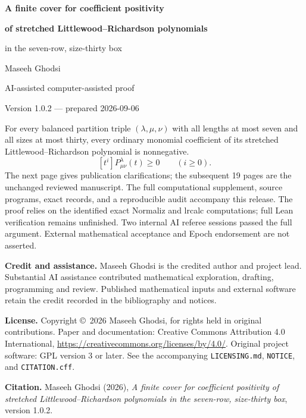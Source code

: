 \documentclass[11pt]{article}
\begin{document}
\thispagestyle{empty}
\begin{center}
{\LARGE\bfseries A finite cover for coefficient positivity\par}
\vspace{0.25cm}
{\Large\bfseries of stretched Littlewood--Richardson polynomials\par}
\vspace{0.25cm}
{\large in the seven-row, size-thirty box\par}
\vspace{0.85cm}
{\Large Maseeh Ghodsi\par}
\vspace{0.3cm}
AI-assisted computer-assisted proof\par
Version 1.0.2 --- prepared 2026-09-06\par
\end{center}
\vspace{0.55cm}
For every balanced partition triple $(\lambda,\mu,\nu)$ with all lengths at
most seven and all sizes at most thirty, every ordinary monomial coefficient
of its stretched Littlewood--Richardson polynomial is nonnegative.
\[
 [t^i]P^{\lambda}_{\mu\nu}(t)\ge0\qquad(i\ge0).
\]
The next page gives publication clarifications; the subsequent 19 pages
are the unchanged reviewed manuscript. The full
computational supplement, source programs, exact records, and a reproducible
audit accompany this release. The proof relies on the identified exact
Normaliz and lrcalc computations; full Lean verification remains unfinished.
Two internal AI referee sessions passed the full argument. External
mathematical acceptance and Epoch endorsement are not asserted.
\par\medskip
\textbf{Credit and assistance.} Maseeh Ghodsi is the credited author and project
lead. Substantial AI assistance contributed mathematical exploration,
drafting, programming and review. Published mathematical inputs and external
software retain the credit recorded in the bibliography and notices.
\par\medskip
\textbf{License.} Copyright \copyright\ 2026 Maseeh Ghodsi, for rights held in
original contributions. Paper and documentation: Creative Commons Attribution
4.0 International, \url{https://creativecommons.org/licenses/by/4.0/}.
Original project software: GPL version 3 or later. See the accompanying
\texttt{LICENSING.md}, \texttt{NOTICE}, and \texttt{CITATION.cff}.
\par\medskip
\textbf{Citation.} Maseeh Ghodsi (2026), \emph{A finite cover for coefficient
positivity of stretched Littlewood--Richardson polynomials in the seven-row,
size-thirty box}, version 1.0.2.
\clearpage


\end{document}
